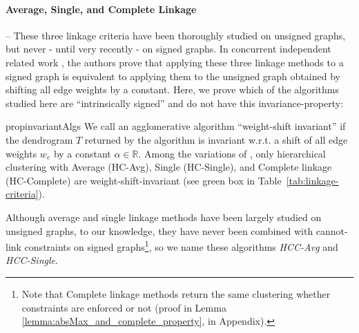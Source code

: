 \paragraph{Average, Single, and Complete Linkage} -- These three linkage criteria have been thoroughly studied on unsigned graphs, but never - until very recently - on signed graphs. In concurrent independent related work \cite{chehreghani2020hierarchical}, the authors prove that applying these three linkage methods to a signed graph is equivalent to applying them to the unsigned graph obtained by shifting all edge weights by a constant.  Here, we prove which of the algorithms studied here are ``intrinsically signed'' and do not have this invariance-property:
\begin{restatable}{prop}{invariantAlgs}
\label{prop:weight_shift_invariant}
We call an agglomerative algorithm ``weight-shift invariant'' if the dendrogram $T$ returned by the algorithm is invariant w.r.t. a shift of all edge weights $w_e$  by a constant $\alpha\in \mathbb{R}$. Among the variations of \algname{}, only hierarchical clustering with Average (HC-Avg), Single (HC-Single), and Complete linkage (HC-Complete) are weight-shift-invariant (see green box in Table~\ref{tab:linkage-criteria}).
\end{restatable}
\noindent Although average and single linkage methods have been largely studied on unsigned graphs, to our knowledge, they have never been combined with cannot-link constraints on signed graphs\footnote{Note that Complete linkage methods return the same clustering whether constraints are enforced or not (proof in Lemma \ref{lemma:absMax_and_complete_property}, in Appendix).}, so we name these algorithms \emph{HCC-Avg} and \emph{HCC-Single}. 




